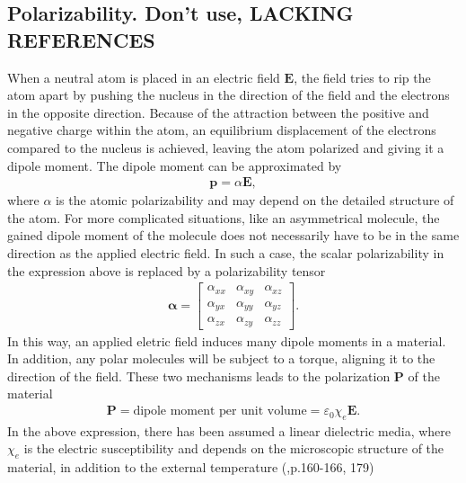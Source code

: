\subsection{Polarizability. Don't use, LACKING REFERENCES}
When a neutral atom is placed in an electric field $\boldsymbol{E}$, the field tries to rip the
atom apart by pushing the nucleus in the direction of the field and the electrons in the opposite direction.
Because of the attraction between the positive and negative charge within the atom, an equilibrium displacement
of the electrons compared to the nucleus is achieved, leaving the atom polarized and giving it a
dipole moment. The dipole moment can be approximated by
\begin{align}
   \boldsymbol{p} = \alpha \boldsymbol{E},
\end{align}
where $\alpha$ is the atomic polarizability and may depend on the detailed structure of the atom.
For more complicated situations, like an asymmetrical molecule, the gained dipole moment of the 
molecule does not necessarily have to be in the same direction as the applied electric field.
In such a case, the scalar polarizability in the expression above is replaced by a polarizability tensor
\begin{align}
   \boldsymbol{\alpha} = 
\begin{bmatrix}
   \alpha_{xx}   &   \alpha_{xy}  &  \alpha_{xz}  \\
   \alpha_{yx}   &   \alpha_{yy}  &  \alpha_{yz}  \\
   \alpha_{zx}   &   \alpha_{zy}  &  \alpha_{zz} 
\end{bmatrix}
.
\end{align}
In this way, an applied eletric field induces many dipole moments in a material. In addition,
any polar molecules will be subject to a torque, aligning it to the direction of the field.
These two mechanisms leads to the polarization $\boldsymbol{P}$ of the material
\begin{align}
   \boldsymbol{P} = \text{dipole moment per unit volume} = \varepsilon_0 \chi_e \boldsymbol{E}.
\end{align}
In the above expression, there has been assumed a linear dielectric media, where $\chi_e$ is the electric 
susceptibility and depends on the microscopic structure of the material, in addition to the external 
temperature (\cite{Griffiths},p.160-166, 179)


